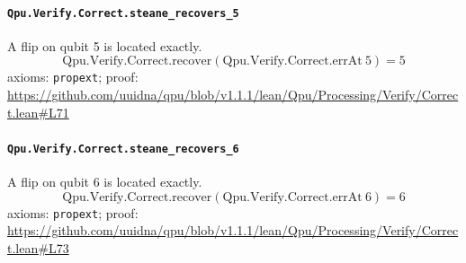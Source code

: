 \documentclass[11pt]{article}
\begin{document}
\paragraph{\texttt{Qpu.Verify.Correct.steane\_recovers\_5}}
A flip on qubit 5 is located exactly.
\[ \mathrm{Qpu.Verify.Correct.recover} (\mathrm{Qpu.Verify.Correct.errAt}\ 5) = 5 \]
\noindent axioms: \texttt{propext}; proof: \url{https://github.com/uuidna/qpu/blob/v1.1.1/lean/Qpu/Processing/Verify/Correct.lean\#L71}

\paragraph{\texttt{Qpu.Verify.Correct.steane\_recovers\_6}}
A flip on qubit 6 is located exactly.
\[ \mathrm{Qpu.Verify.Correct.recover} (\mathrm{Qpu.Verify.Correct.errAt}\ 6) = 6 \]
\noindent axioms: \texttt{propext}; proof: \url{https://github.com/uuidna/qpu/blob/v1.1.1/lean/Qpu/Processing/Verify/Correct.lean\#L73}
\end{document}

